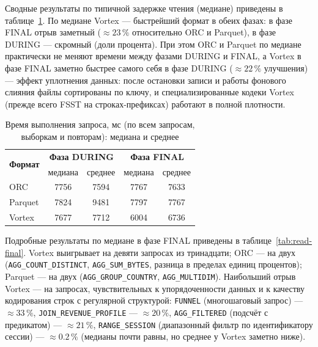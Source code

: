 Сводные результаты по типичной задержке чтения (медиане) приведены в таблице~\ref{tab:read-med}. По медиане Vortex --- быстрейший формат в обеих фазах:
в фазе FINAL отрыв заметный ($\approx 23\,\%$ относительно ORC и Parquet), в фазе
DURING --- скромный (доли процента). При этом ORC и Parquet по медиане практически
не меняют времени между фазами DURING и FINAL, а Vortex в фазе FINAL заметно
быстрее самого себя в фазе DURING ($\approx 22\,\%$ улучшения) --- эффект уплотнения
данных: после остановки записи и работы фонового слияния файлы сортированы по
ключу, и специализированные кодеки Vortex (прежде всего FSST на строках-префиксах)
работают в полной плотности.

\begin{table}
    \caption{Время выполнения запроса, мс (по всем запросам, выборкам и повторам): медиана и среднее}
    \label{tab:read-med}
    \begin{tabularx}{\textwidth}{|X|c|c|c|c|}\hline
    \multirow{2}{*}{\textbf{Формат}} & \multicolumn{2}{c|}{\textbf{Фаза DURING}} & \multicolumn{2}{c|}{\textbf{Фаза FINAL}} \\ \hhline{~----}
    & медиана & среднее & медиана & среднее \\ \hline
    ORC     & 7756 & 7594 & 7767 & 7633 \\ \hline
    Parquet & 7824 & 9481 & 7797 & 7767 \\ \hline
    Vortex  & 7677 & 7712 & 6004 & 6736 \\ \hline
    \end{tabularx}
\end{table}

Подробные результаты по медиане в фазе FINAL приведены в таблице~\ref{tab:read-final}. Vortex
выигрывает на девяти запросах из тринадцати; ORC --- на двух
(\texttt{AGG\_COUNT\_DISTINCT}, \texttt{AGG\_SUM\_BYTES}, разница в пределах
единиц процентов); Parquet --- на двух (\texttt{AGG\_GROUP\_COUNTRY},
\texttt{AGG\_MULTIDIM}). Наибольший отрыв Vortex --- на запросах, чувствительных к
упорядоченности данных и к качеству кодирования строк с регулярной структурой:
\texttt{FUNNEL} (многошаговый запрос) --- $\approx 33\,\%$,
\texttt{JOIN\_REVENUE\_PROFILE} --- $\approx 20\,\%$, \texttt{AGG\_FILTERED}
(подсчёт с предикатом) --- $\approx 21\,\%$, \texttt{RANGE\_SESSION} (диапазонный
фильтр по идентификатору сессии) --- $\approx 0.2\,\%$ (медианы почти равны, но
среднее у Vortex заметно ниже).

